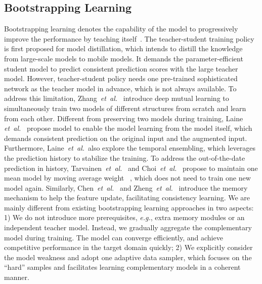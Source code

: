 \documentclass[journal]{IEEEtran}
\def\eg{\emph{e.g.}}
\def\etal{\emph{et~al.}}
\begin{document}
\subsection{Bootstrapping Learning}
Bootstrapping learning denotes the capability of the model to progressively improve the performance by teaching itself~\cite{reed2014training}. The teacher-student training policy~\cite{hinton2015distilling} is first proposed for model distillation, which intends to distill the knowledge from large-scale models to mobile models. It demands the parameter-efficient student model to predict consistent prediction scores with the large teacher model. 
However, teacher-student policy needs one pre-trained sophisticated network as the teacher model in advance, which is not always available. To address this limitation, Zhang~\etal~\cite{zhang2018deep} introduce deep mutual learning to simultaneously train two models of different structures from scratch and learn from each other. 
Different from preserving two models during training, Laine  \etal~\cite{laine2016temporal} propose  model to enable the model learning from the model itself, which demands consistent prediction on the original input and the augmented input. Furthermore, Laine~\etal~also explore the temporal ensembling, which leverages the prediction history to stabilize the training.
To address the out-of-the-date prediction in history, Tarvainen~\etal~\cite{tarvainen2017mean} and Choi~\etal~\cite{choi2019self} propose to maintain one mean model by moving average weight
~\cite{cha2021domain}, which does not need to train one new model again. Similarly, Chen~\etal~\cite{chen2018semi} and Zheng~\etal~\cite{zheng2019unsupervised} introduce the memory mechanism to help the feature update, facilitating consistency learning. 
We are mainly different from existing bootstrapping learning approaches in two aspects: 1) We do not introduce more prerequisites, \eg, extra memory modules or an independent teacher model. Instead, we gradually aggregate the complementary model during training. The model can converge efficiently, and achieve competitive performance in the target domain quickly; 
2) We explicitly consider the model weakness and adopt one adaptive data sampler, which focuses on the ``hard'' samples and facilitates learning complementary models in a coherent manner.
\end{document}

